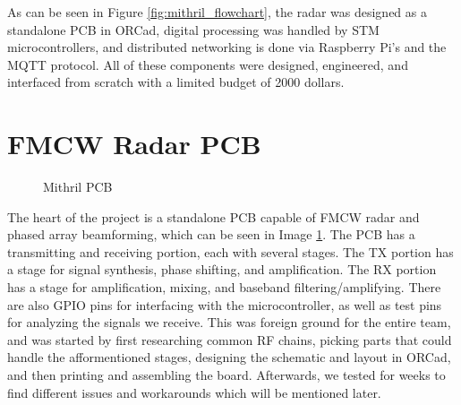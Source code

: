 As can be seen in Figure \ref{fig:mithril_flowchart},
the radar was designed as a standalone PCB in ORCad, digital processing was handled by
STM microcontrollers, and distributed networking is done via Raspberry Pi's and the MQTT protocol.
All of these components were designed, engineered, and interfaced from scratch with a limited budget
of 2000 dollars.

\section{FMCW Radar PCB}
\begin{figure}[H]
  \centering
\caption{Mithril PCB}
\label{img:mithrilPCB_1}
\end{figure}
The heart of the project is a standalone PCB capable of FMCW radar and phased array beamforming, which can be seen in Image \ref{img:mithrilPCB_1}.
The PCB has a transmitting and receiving portion, each with several stages. The TX portion has a stage for signal synthesis,
phase shifting, and amplification. The RX portion has a stage for amplification, mixing, and baseband filtering/amplifying.
There are also GPIO pins for interfacing with the microcontroller, as well as test pins for analyzing the signals we receive.
This was foreign ground for the entire team, and was started by first researching common RF chains, picking parts that could handle
the afformentioned stages, designing the schematic and layout in ORCad, and then printing and assembling the board. Afterwards,
we tested for weeks to find different issues and workarounds which will be mentioned later.

